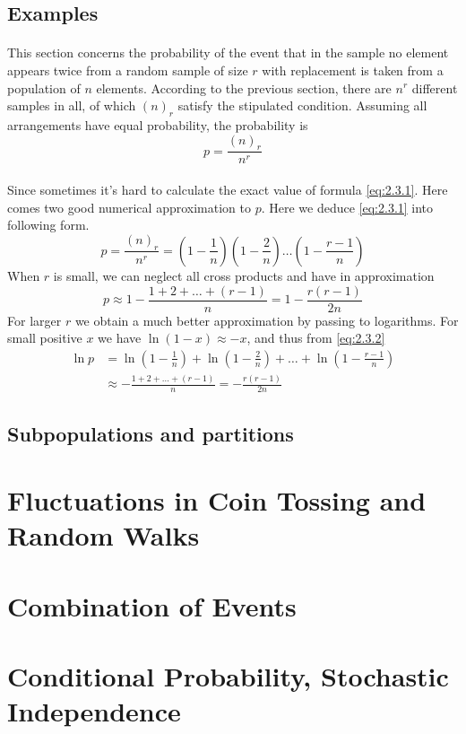 \documentclass{article}
\numberwithin{equation}{subsection}
\begin{document}
		\subsection{Examples}
			\paragraph{} This section concerns the probability of the event that in the sample no element appears twice from a random sample of size $r$ with replacement is taken from a population of $n$ elements. According to the previous section, there are $n^r$ different samples in all, of which $(n)_r$ satisfy the stipulated condition. Assuming all arrangements have equal probability, the probability is 
			\begin{equation}
				\label{eq:2.3.1}
				p = \frac{(n)_r}{n^r}
			\end{equation}
			\paragraph{} Since sometimes it's hard to calculate the exact value of formula \eqref{eq:2.3.1}. Here comes two good numerical approximation to $p$. Here we deduce \eqref{eq:2.3.1} into following form.
			\begin{equation}
				\label{eq:2.3.2}
				p = \frac{(n)_r}{n^r} = \left(1-\frac{1}{n}\right)\left(1-\frac{2}{n}\right)\dots\left(1-\frac{r-1}{n}\right)
			\end{equation} 
			When $r$ is small, we can neglect all cross products and have in approximation
			\begin{equation}
				\label{eq:2.3.3}
				p \approx 1-\frac{1+2+\dots+(r-1)}{n} = 1-\frac{r(r-1)}{2n}
			\end{equation}
			For larger $r$ we obtain a much better approximation by passing to logarithms. For small positive $x$ we have $\ln(1-x)\approx-x$, and thus from \eqref{eq:2.3.2}
			\begin{equation}
				\label{eq:2.3.4}
				\begin{aligned}
					\ln p &= \ln \left(1-\frac{1}{n}\right)+\ln \left(1-\frac{2}{n}\right)+\dots+\ln \left(1-\frac{r-1}{n}\right)\\ &\approx-\frac{1+2+\dots+(r-1)}{n} = -\frac{r(r-1)}{2n}
				\end{aligned}			
			\end{equation}
		\subsection{Subpopulations and partitions}
			
	\newpage
	\section{Fluctuations in Coin Tossing and Random Walks}
			
	\newpage
	\section{Combination of Events}
					
	\newpage
	\section{Conditional Probability, Stochastic Independence}
			
		
\end{document}
